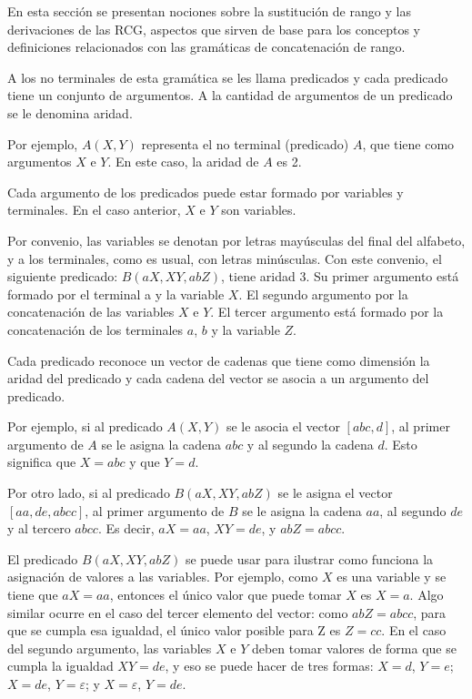 \documentclass[12pt]{article}
\begin{document}
En esta sección se presentan nociones sobre la sustitución de rango y las derivaciones de las RCG, aspectos 
que sirven de base para los conceptos y definiciones relacionados con las gramáticas de concatenación de rango.

A los no terminales de esta gramática se les llama predicados y cada predicado tiene un conjunto de argumentos. 
A la cantidad de argumentos de un predicado se le denomina aridad.

Por ejemplo, $A(X,Y)$ representa el no terminal (predicado) $A$, que tiene como argumentos $X$ e $Y$. En este caso, la aridad de $A$ es 2.

Cada argumento de los predicados puede estar formado por variables y terminales. En el caso anterior, $X$ e $Y$ son variables.

Por convenio, las variables se denotan por letras mayúsculas del final del alfabeto, y a los terminales, como es 
usual, con letras minúsculas. Con este convenio, el siguiente predicado: $B(aX, XY, abZ)$, tiene aridad 3. Su 
primer argumento está formado por el terminal a y la variable $X$. El segundo argumento por la concatenación 
de las variables $X$ e $Y$. El tercer argumento está formado por la concatenación de los terminales $a$, $b$ y 
la variable $Z$. 

Cada predicado reconoce un vector de cadenas que tiene como dimensión la aridad del predicado y cada cadena del vector se asocia a un argumento del predicado.

Por ejemplo, si al predicado $A(X,Y)$ se le asocia el vector $[abc,d]$, al primer argumento de $A$ se le asigna
la cadena $abc$ y al segundo la cadena $d$. Esto significa que $X=abc$ y que $Y=d$.

Por otro lado, si al predicado $B(aX, XY, abZ)$ se le asigna el vector $[aa,de,abcc]$,
al primer argumento de $B$ se le asigna la cadena $aa$, al segundo $de$ y al tercero $abcc$. Es decir, $aX=aa$, $XY=de$, y $abZ=abcc$.

El predicado $B(aX, XY, abZ)$ se puede usar para ilustrar como funciona la asignación de valores a las variables.
Por ejemplo, como $X$ es una variable y se tiene que $aX=aa$, entonces el único valor que puede tomar $X$ es $X=a$. 
Algo similar ocurre en el caso del tercer elemento del vector: como $abZ=abcc$, para que se cumpla esa igualdad, 
el único valor posible para Z es $Z=cc$. En el caso del segundo argumento, las variables $X$ e $Y$ deben tomar valores 
de forma que se cumpla la igualdad $XY=de$, y eso se puede hacer de tres formas: $X=d$, $Y=e$; $X=de$, $Y=\varepsilon$; 
y $X=\varepsilon$, $Y=de$. 
\end{document}
